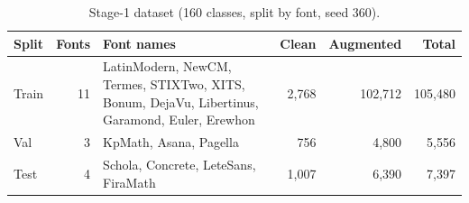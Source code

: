 \begin{table}[h]
\centering\small
\caption{Stage-1 dataset (160 classes, split by font, seed 360).}
\label{tab:data}
\begin{tabular}{lrp{5.2cm}rrr}
\toprule
Split & Fonts & Font names & Clean & Augmented & Total \\
\midrule
Train & 11 & LatinModern, NewCM, Termes, STIXTwo, XITS, Bonum, DejaVu, Libertinus, Garamond, Euler, Erewhon & 2,768 & 102,712 & 105,480 \\
Val & 3 & KpMath, Asana, Pagella & 756 & 4,800 & 5,556 \\
Test & 4 & Schola, Concrete, LeteSans, FiraMath & 1,007 & 6,390 & 7,397 \\
\bottomrule
\end{tabular}
\end{table}
